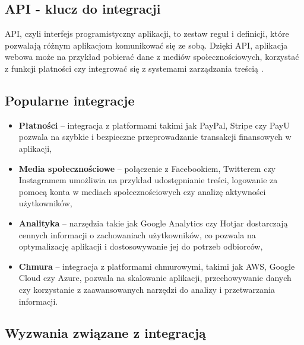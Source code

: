\subsection{API - klucz do integracji}

API, czyli interfejs programistyczny aplikacji, to zestaw reguł i definicji, które pozwalają różnym aplikacjom komunikować się ze sobą. Dzięki API, aplikacja webowa może na przykład pobierać dane z mediów społecznościowych, korzystać z funkcji płatności czy integrować się z systemami zarządzania treścią \cite{apiIntegration}.

\subsection{Popularne integracje}

\begin{itemize}
\item \textbf{Płatności} -- integracja z platformami takimi jak PayPal, Stripe czy PayU pozwala na szybkie i bezpieczne przeprowadzanie transakcji finansowych w aplikacji,
\item \textbf{Media społecznościowe} -- połączenie z Facebookiem, Twitterem czy Instagramem umożliwia na przykład udostępnianie treści, logowanie za pomocą konta w mediach społecznościowych czy analizę aktywności użytkowników,
\item \textbf{Analityka} -- narzędzia takie jak Google Analytics czy Hotjar dostarczają cennych informacji o zachowaniach użytkowników, co pozwala na optymalizację aplikacji i dostosowywanie jej do potrzeb odbiorców,
\item \textbf{Chmura} -- integracja z platformami chmurowymi, takimi jak AWS, Google Cloud czy Azure, pozwala na skalowanie aplikacji, przechowywanie danych czy korzystanie z zaawansowanych narzędzi do analizy i przetwarzania informacji.
\end{itemize}

\subsection{Wyzwania związane z integracją}

